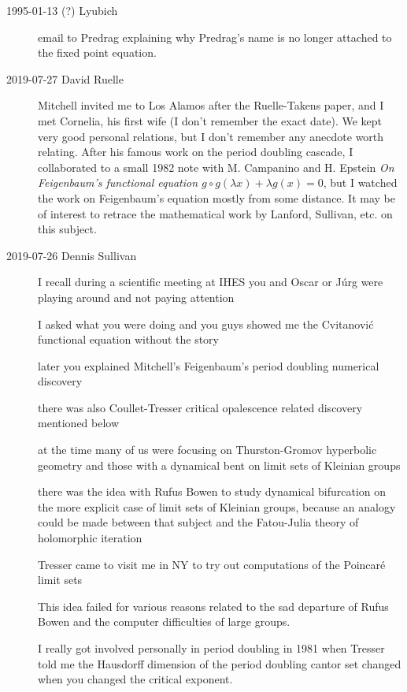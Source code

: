 \begin{description}
\item[1995-01-13 (?) Lyubich]
email to Predrag explaining why Predrag's name is no longer attached
to the fixed point equation.

\item[2019-07-27 David Ruelle] %
Mitchell invited me to Los Alamos after the Ruelle-Takens paper, and I
met Cornelia, his first wife (I don't remember the exact date).  We kept
very good personal relations, but I don't remember any anecdote worth
relating.  After his famous work on the period doubling cascade, I
collaborated to a small 1982 note with M. Campanino and H.
Epstein {\em On {Feigenbaum}'s functional equation {$g \circ
g(\lambda x) + \lambda g(x) = 0$}}, but I watched the work on
Feigenbaum's equation mostly from some distance.  It may be of interest
to retrace the mathematical work by Lanford, Sullivan, etc. on this
subject.

\item[2019-07-26 Dennis Sullivan] %
I recall during a scientific meeting at IHES you and Oscar or J{\'u}rg
were playing around and not paying attention

I asked what you were doing and you guys showed me the Cvitanovi{\'c} functional
equation without the story

later you explained Mitchell's Feigenbaum's period doubling
numerical discovery

there was also Coullet-Tresser critical opalescence related discovery
mentioned below

at the time  many of us were focusing on Thurston-Gromov hyperbolic
geometry and  those with a dynamical bent on limit sets of Kleinian
groups

there was the idea with Rufus Bowen to study dynamical bifurcation on the
more explicit case of limit sets of Kleinian groups,
because an analogy could be made between that subject and the Fatou-Julia
theory of holomorphic iteration

Tresser came to visit me in NY to try out computations of the Poincar\'e
limit sets

This idea failed for various reasons related to the sad departure of
Rufus Bowen and the computer difficulties of large groups.

I really got involved personally in period doubling in 1981 when Tresser
told me the Hausdorff dimension  of the period doubling cantor set changed
when you changed the critical exponent.


\end{description}
